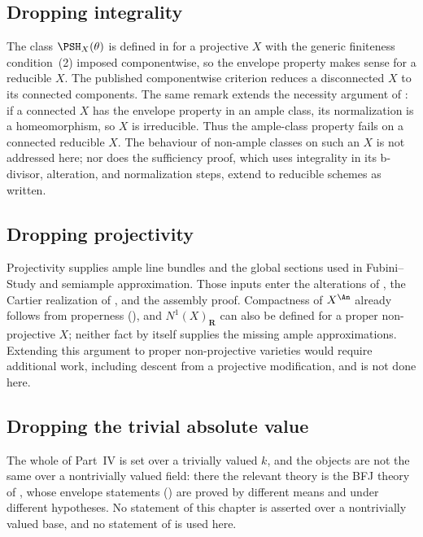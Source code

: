 \subsection{Dropping integrality}
\label{sec:ch45-failure-integral}

The class $\PSH_X(\theta)$ is defined in  for a
projective $X$ with the generic finiteness condition
\,(2) imposed componentwise, so the envelope property makes
sense for a reducible $X$.  The published componentwise criterion
\cite[Remark~5.15]{BJ22} reduces a disconnected $X$ to its connected
components.  The same remark extends the necessity argument of
: if a connected $X$ has the envelope
property in an ample class, its normalization is a homeomorphism, so $X$
is irreducible.  Thus the ample-class property fails on a connected
reducible $X$.  The behaviour of non-ample classes on such an $X$ is not
addressed here; nor does the sufficiency proof, which uses integrality in
its b-divisor, alteration, and normalization steps, extend to reducible
schemes as written.

\subsection{Dropping projectivity}
\label{sec:ch45-failure-projective}

Projectivity supplies ample line bundles and the global sections used in
Fubini--Study and semiample approximation.  Those inputs enter the
alterations of , the Cartier realization of
, and the assembly proof.  Compactness of
$X^{\An}$ already follows from properness
(), and $N^1(X)_{\mathbf R}$ can
also be defined for a proper non-projective $X$; neither fact by itself
supplies the missing ample approximations.  Extending this argument to
proper non-projective varieties would require additional work, including
descent from a projective modification, and is not done here.

\subsection{Dropping the trivial absolute value}
\label{sec:ch45-failure-trivial}

The whole of Part~IV is set over a trivially valued $k$, and the objects
are not the same over a nontrivially valued field: there the relevant theory
is the BFJ theory of , whose envelope statements
() are proved by different means and under
different hypotheses.  No statement of this chapter is asserted over a
nontrivially valued base, and no statement of  is
used here.


